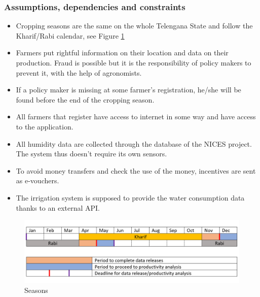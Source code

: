 \subsubsection{Assumptions, dependencies and constraints}
\begin{itemize}
	\item
	Cropping seasons are the same on the whole Telengana State and follow the Kharif/Rabi calendar, see Figure \ref{fig:seasons} %
	\item
	Farmers put rightful information on their location and data on their production. Fraud is possible but it is the responsibility of policy makers to prevent it, with the help of agronomists.
	\item
	If a policy maker is missing at some farmer's registration, he/she will be found before the end of the cropping season.
	\item
	All farmers that register have access to internet in some way and have access to the application.
	\item
	All humidity data are collected through the database of the NICES project. The system thus doesn't require its own sensors.
	\item
	To avoid money transfers and check the use of the money, incentives are sent as e-vouchers.
	\item
	The irrigation system is supposed to provide the water consumption data thanks to an external API.
	
\end{itemize}

\begin{figure}[H]
	
	\centering
	
	\includegraphics[width=\columnwidth]{Images/croping-seasons-calendar.png}
	
	\caption{Seasons}
	
	\label{fig:seasons}
	
\end{figure}


